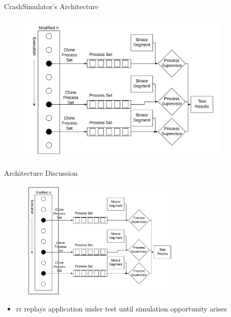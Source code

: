 \documentclass[pdf]{beamer}
\begin{document}

\begin{frame}{CrashSimulator's Architecture}
    \begin{figure}
    \centering
    \includegraphics[width = 0.9\textwidth]{images/architecture}
  \end{figure}
\end{frame}


\begin{frame}{Architecture Discussion}
  \begin{figure}
    \centering
    \includegraphics[width = 0.7\textwidth]{images/architecture_replay}
  \end{figure}
  \begin{itemize}
    \item{rr replays application under test until simulation opportunity
      arises}
  \end{itemize}
\end{frame}
\end{document}
